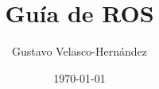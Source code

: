 \documentclass{book}
\begin{document}
\title{Guía de ROS}
\author{Gustavo Velasco-Hernández}
\date{\today}
\maketitle

\tableofcontents
\setcounter{tocdepth}{3}






%
\end{document}
